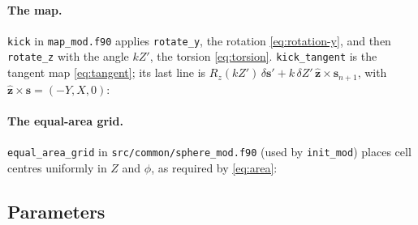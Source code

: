 \documentclass[11pt,a4paper]{article}
\newcommand{\vs}{\bm{s}}
\begin{document}
\paragraph{The map.} \texttt{kick} in \texttt{map\_mod.f90} applies \texttt{rotate\_y}, the rotation
\eqref{eq:rotation-y}, and then \texttt{rotate\_z} with the angle $kZ'$, the torsion \eqref{eq:torsion}.
\texttt{kick\_tangent} is the tangent map \eqref{eq:tangent}; its last line is $R_z(kZ')\,\delta\vs' + k\,\delta Z'\,
\hat{\bm z}\times\vs_{n+1}$, with $\hat{\bm z}\times\vs = (-Y, X, 0)$:


\paragraph{The equal-area grid.} \texttt{equal\_area\_grid} in \texttt{src/common/sphere\_mod.f90} (used by \texttt{init\_mod}) places cell centres uniformly in
$Z$ and $\phi$, as required by \eqref{eq:area}:


\subsection{Parameters}
\end{document}
